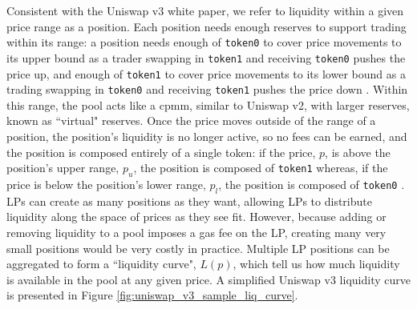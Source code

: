 \documentclass[11pt]{article}
\begin{document}
Consistent with the Uniswap v3 white paper, we refer to liquidity within a given price range as a position. Each position needs enough reserves to support trading within its range: a position needs enough of \texttt{token0} to cover price movements to its upper bound as a trader swapping in \texttt{token1} and receiving \texttt{token0} pushes the price up, and enough of \texttt{token1} to cover price movements to its lower bound as a trading swapping in \texttt{token0} and receiving \texttt{token1} pushes the price down \citep{Uniswapv3}. Within this range, the pool acts like a \gls{cpmm}, similar to Uniswap v2, with larger reserves, known as ``virtual" reserves. Once the price moves outside of the range of a position, the position's liquidity is no longer active, so no fees can be earned, and the position is composed entirely of a single token: if the price, $p$, is above the position's upper range, $p_u$, the position is composed of \texttt{token1} whereas, if the price is below the position's lower range, $p_l$, the position is composed of \texttt{token0} \citep{Uniswapv3}. LPs can create as many positions as they want, allowing LPs to distribute liquidity along the space of prices as they see fit. However, because adding or removing liquidity to a pool imposes a gas fee on the LP, creating many very small positions would be very costly in practice. Multiple LP positions can be aggregated to form a ``liquidity curve", $L(p)$, which tell us how much liquidity is available in the pool at any given price. A simplified Uniswap v3 liquidity curve is presented in Figure \ref{fig:uniswap_v3_sample_liq_curve}.
\end{document}
